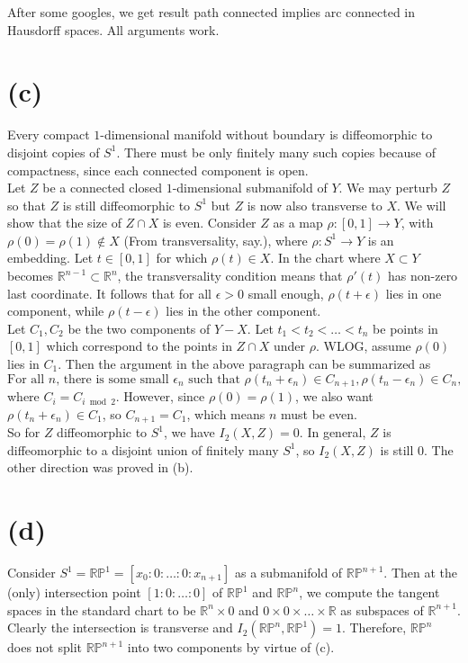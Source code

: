 \documentclass{amsbook}
\theoremstyle{theorem}
\theoremstyle{plain}
\theoremstyle{remark}
\newcommand{\R}{\mathbb R}
\renewcommand{\P}{\mathbb P}
\begin{document}
After some googles, we get result path connected implies arc connected in Hausdorff spaces. All arguments work.

\section*{(c)}
Every compact $1$-dimensional manifold without boundary is diffeomorphic to disjoint copies of $S^1$. There must be only finitely many such copies because of compactness, since each connected component is open. \\

Let $Z$ be a connected closed $1$-dimensional submanifold of $Y$. We may perturb $Z$ so that $Z$ is still diffeomorphic to $S^1$ but $Z$ is now also transverse to $X$. We will show that the size of $Z \cap X$ is even. Consider $Z$ as a map $\rho: [0,1] \to Y$, with $\rho(0) = \rho(1) \not \in X$ (From transversality, say.), where $\rho: S^1 \to Y$ is an embedding. Let $t \in [0,1]$ for which $\rho(t) \in X$. In the chart where $X\subset Y$ becomes $\R^{n-1}\subset \R^n$, the transversality condition means that $\rho'(t)$ has non-zero last coordinate. It follows that for all $\epsilon > 0$ small enough, $\rho(t+\epsilon)$ lies in one component, while $\rho(t - \epsilon)$ lies in the other component.\\ 

Let $C_1, C_2$ be the two components of $Y-X$. Let $t_1 < t_2 < \dots < t_n$ be points in $[0,1]$ which correspond to the points in $Z\cap X$ under $\rho$. WLOG, assume $\rho(0)$ lies in $C_1$. Then the argument in the above paragraph can be summarized as \[\text{For all $n$, there is some small $\epsilon_n$ such that } \rho(t_n + \epsilon_n) \in C_{n+1}, \rho(t_n-\epsilon_n) \in C_n,\] where $C_i = C_{i\bmod 2}$. However, since $\rho(0) = \rho(1)$, we also want $\rho(t_n+\epsilon_n) \in C_1$, so $C_{n+1} = C_1$, which means $n$ must be even.\\

So for $Z$ diffeomorphic to $S^1$, we have $I_2(X,Z) = 0$. In general, $Z$ is diffeomorphic to a disjoint union of finitely many $S^1$, so $I_2(X,Z)$ is still $0$. The other direction was proved in (b).

\section*{(d)}

Consider $S^1 = \R\P^1 = [x_0:0:\dots:0:x_{n+1}]$ as a submanifold of $\R\P^{n+1}$. Then at the (only) intersection point $[1:0:\dots:0]$ of $\R\P^1$ and $\R\P^n$, we compute the tangent spaces in the standard chart to be $\R^n \times 0$ and $0\times 0 \times \dots \times \R$ as subspaces of $\R^{n+1}$. Clearly the intersection is transverse and $I_2(\R\P^n, \R\P^1) = 1$. Therefore, $\R\P^n$ does not split $\R\P^{n+1}$ into two components by virtue of (c). \\
\end{document}
